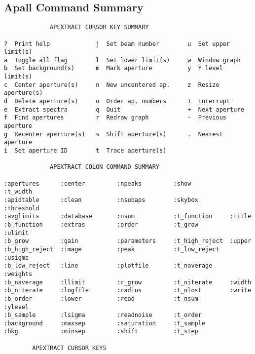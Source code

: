 \subsection{Apall Command Summary} \label{sec:ApallCommandSummary}

\begingroup \fontsize{10pt}{10pt}
\selectfont
\begin{verbatim} 
       		 APEXTRACT CURSOR KEY SUMMARY

?  Print help             j  Set beam number        u  Set upper limit(s)
a  Toggle all flag        l  Set lower limit(s)     w  Window graph
b  Set background(s)      m  Mark aperture          y  Y level limit(s)
c  Center aperture(s)     n  New uncentered ap.     z  Resize aperture(s)
d  Delete aperture(s)     o  Order ap. numbers      I  Interrupt
e  Extract spectra        q  Quit                   +  Next aperture
f  Find apertures         r  Redraw graph           -  Previous aperture
g  Recenter aperture(s)   s  Shift aperture(s)      .  Nearest aperture
i  Set aperture ID        t  Trace aperture(s)      

       		 APEXTRACT COLON COMMAND SUMMARY

:apertures      :center         :npeaks         :show           :t_width
:apidtable      :clean          :nsubaps        :skybox         :threshold
:avglimits      :database       :nsum           :t_function     :title
:b_function     :extras         :order          :t_grow         :ulimit
:b_grow         :gain           :parameters     :t_high_reject  :upper
:b_high_reject  :image          :peak           :t_low_reject   :usigma
:b_low_reject   :line           :plotfile       :t_naverage     :weights
:b_naverage     :llimit         :r_grow         :t_niterate     :width
:b_niterate     :logfile        :radius         :t_nlost        :write
:b_order        :lower          :read           :t_nsum         :ylevel
:b_sample       :lsigma         :readnoise      :t_order        
:background     :maxsep         :saturation     :t_sample       
:bkg            :minsep         :shift          :t_step         

		APEXTRACT CURSOR KEYS


\end{verbatim}
